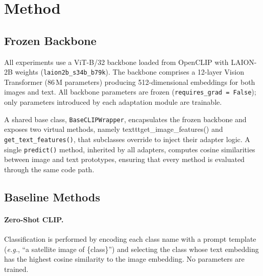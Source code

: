\documentclass[10pt,twocolumn,letterpaper]{article}
\newcommand{\eg}{\emph{e.g.}}
\begin{document}
\section{Method}\label{sec:method}

%


\subsection{Frozen Backbone}\label{sec:backbone}

All experiments use a ViT-B/32 backbone loaded from OpenCLIP with LAION-2B weights (\texttt{laion2b\_s34b\_b79k}). The backbone comprises a 12-layer Vision Transformer (86\,M parameters) producing 512-dimensional embeddings for both images and text. All backbone parameters are frozen (\texttt{requires\_grad\,=\,False}); only parameters introduced by each
adaptation module are trainable.

A shared base class, \texttt{BaseCLIPWrapper}, encapsulates the frozen backbone and exposes two virtual methods, namely texttt{get\_image\_features()} and \texttt{get\_text\_features()}, that subclasses override to inject their adapter logic. A single \texttt{predict()} method, inherited by all adapters, computes cosine similarities between image and text
prototypes, ensuring that every method is evaluated through the same code path.


\subsection{Baseline Methods}\label{sec:baselines}

\paragraph{Zero-Shot CLIP.}
Classification is performed by encoding each class name with a prompt template (\eg, ``a satellite image of \{class\}'') and selecting the class whose text embedding has the highest cosine similarity to the image embedding. No parameters are trained.
\end{document}
